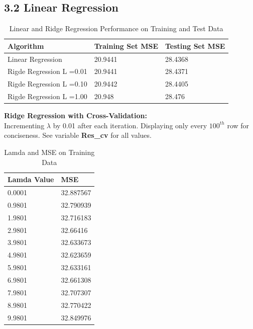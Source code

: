 \documentclass[12pt]{article}
\begin{document}
\subsection*{3.2 Linear Regression}
\begin{table}[h]
\centering
\caption{Linear and Ridge Regression Performance on Training and Test Data}
\label{Linear and Ridge Regression}
\begin{tabular}{|l|l|l|}
\hline
\textbf{Algorithm}        & \textbf{Training Set MSE} & \textbf{Testing Set MSE} \\ \hline
Linear Regression         & 20.9441                   & 28.4368                  \\ \hline
Rigde Regression  L =0.01 & 20.9441                   & 28.4371                  \\ \hline
Rigde Regression  L =0.10 & 20.9442                   & 28.4405                  \\ \hline
Rigde Regression  L =1.00 & 20.948                    & 28.476                   \\ \hline
\end{tabular}
\end{table}
\newpage
\textbf{Ridge Regression with Cross-Validation:}\\
Incrementing $ \lambda $ by 0.01 after each iteration. Displaying only every $ 100^{th} $ row for conciseness. See variable \textbf{Res\_cv}  for all values.
\begin{table}[h]
\centering
\caption{Lamda and MSE on Training Data }
\label{lamda vs mse}
\begin{tabular}{|l|l|}
\hline
\textbf{Lamda Value} & \textbf{MSE} \\ \hline
0.0001               & 32.887567    \\ \hline
0.9801               & 32.790939    \\ \hline
1.9801               & 32.716183    \\ \hline
2.9801               & 32.66416     \\ \hline
3.9801               & 32.633673    \\ \hline
4.9801               & 32.623659    \\ \hline
5.9801               & 32.633161    \\ \hline
6.9801               & 32.661308    \\ \hline
7.9801               & 32.707307    \\ \hline
8.9801               & 32.770422    \\ \hline
9.9801               & 32.849976    \\ \hline
\end{tabular}
\end{table}
\end{document}
